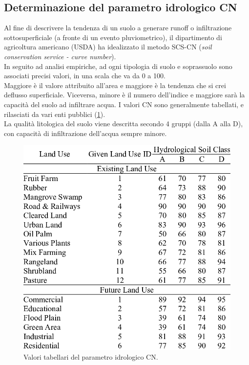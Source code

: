 \subsection{Determinazione del parametro idrologico CN}
Al fine di descrivere la tendenza di un suolo a generare runoff o infiltrazione sottosuperficiale (a fronte di un evento pluviometrico), il dipartimento di agricoltura americano (USDA) ha idealizzato il metodo SCS-CN (\textit{soil conservation service - curve number}).\\
In seguito ad analisi empiriche, ad ogni tipologia di suolo e soprassuolo sono associati precisi valori, in una scala che va da 0 a 100.\\
Maggiore è il valore attribuito all'area e maggiore è la tendenza che si crei deflusso superficiale. Viceversa, minore è il numero dell'indice e maggiore sarà la capacità del suolo ad infiltrare acqua. I valori CN sono generalmente tabellati, e rilasciati da vari enti pubblici (\ref{scs_cn_table}).\\
La qualità litologica del suolo viene descritta secondo 4 gruppi (dalla A alla D), con capacità di infiltrazione dell'acqua sempre minore.\\

\begin{figure}[H]  \centering
    \includegraphics[scale=0.5]{immagini/scs_cn_table.png}
    \caption{Valori tabellari del parametro idrologico CN.}
    \label{scs_cn_table}
\end{figure}

